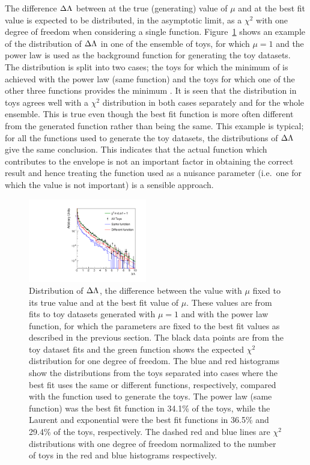 The difference $\Delta\Lambda$  between \nll at the true (generating) value of $\mu$ and at the best fit value is expected to be distributed, in the 
asymptotic limit, as a $\chi^{2}$ with one degree of freedom when considering a single function.
Figure~\ref{fig:functions:chisq} shows an example of the distribution of $\Delta\Lambda$ in one of the ensemble of toys, for which $\mu=1$ and
the power law is used as the background function
for generating the toy datasets.
The distribution is split into two cases; the toys for which the minimum of \nll is achieved with the 
power law (same function) and the toys for which one of the other three functions provides the minimum \nll.
It is seen that the distribution in toys agrees well with a $\chi^2$ distribution in both cases separately and for the whole ensemble. 
This is true even though the best fit function is more often different from the generated function rather than being the same.
This example is typical; for all the functions used to generate the toy datasets, the distributions of $\Delta\Lambda$ give the same conclusion.
This indicates that the actual function which contributes to the envelope is not an important factor in obtaining the correct result
and hence treating the function used as a nuisance parameter (i.e.~one for which the value is not important) is a sensible approach. 
%
\begin{figure}[tbp]
\centering
\includegraphics[width=0.46\textwidth]{functions/gen_pow1_mu1_bias_hists_2parfamily_Correcion_0.pdf}
\caption{Distribution of  $\Delta\Lambda$, the difference
between the \nll value with $\mu$ fixed to its true value and \nll at the best fit value
of $\mu$. These values are from fits to toy datasets generated with 
$\mu=1$ and with the power law function, for which the parameters are fixed to the best fit values as described in the previous section.
The black data points are from the toy dataset fits and the green function
shows the expected $\chi^2$ distribution for one degree of freedom. The blue and red histograms show the distributions from the toys 
separated into cases where the best fit uses the same or different functions, respectively, compared with the function used to generate the toys. 
The power law
(same function) was the best fit function in 34.1\% of the toys, 
while the Laurent and exponential were the best fit functions in 
36.5\% and 29.4\% of the toys, respectively.
The dashed red and blue lines are $\chi^{2}$ distributions with one degree of freedom normalized to the number of toys in the red and blue histograms respectively.}
\label{fig:functions:chisq}
\end{figure}

